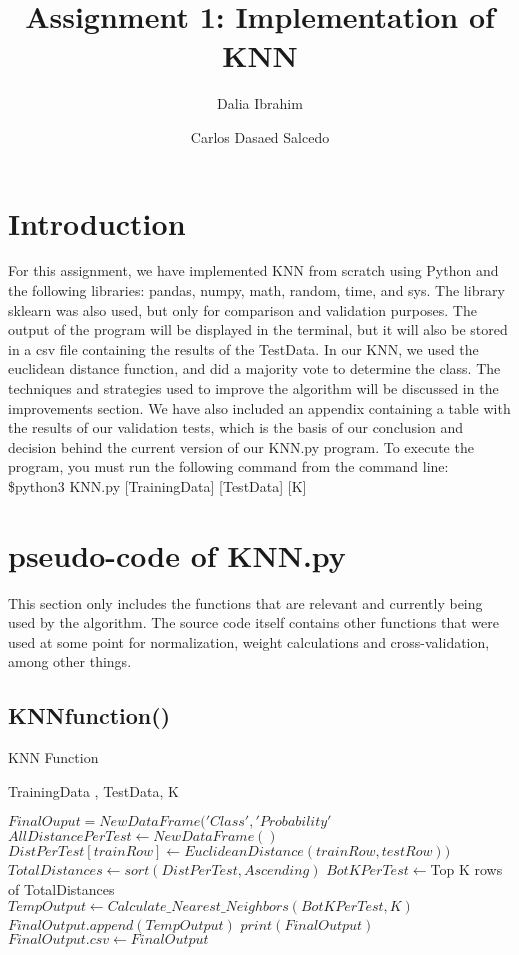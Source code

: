 \documentclass{article}
\author[1]{Dalia Ibrahim}
\author[2]{Carlos Dasaed Salcedo}
\affil[ ]{Studnet ID}
\affil[1]{201893217}
\affil[2]{201892008}
\begin{document}
  

\title{ Assignment 1: Implementation of KNN}


\maketitle
 \section{Introduction}
For this assignment, we have implemented KNN from scratch using Python and the following libraries: pandas, numpy, math, random, time, and sys. The library sklearn was also used, but only for comparison and validation purposes. The output of the program will be displayed in the terminal, but it will also be stored in a csv file containing the results of the TestData. In our KNN, we used the euclidean distance function, and did a majority vote to determine the class. The techniques and strategies used to improve the algorithm will be discussed in the improvements section. We have also included an appendix containing a table with the results of our validation tests, which is the basis of our conclusion and decision behind the current version of our KNN.py program. To execute the program, you must run the following command from the command line: \\
\$python3 KNN.py [TrainingData] [TestData] [K]\\

 \section{pseudo-code of  KNN.py }
This section only includes the functions that are relevant and currently being used by the algorithm. The source code itself contains other functions that were used at some point for normalization, weight calculations and cross-validation, among other things.
 \subsection{KNNfunction()}

\begin{algorithm}[H]
\caption{KNN Function}
\begin{algorithmic}[1]
\REQUIRE TrainingData , TestData, K 
  
\STATE $ FinalOuput = NewDataFrame('Class','Probability'	 $
        \STATE  $AllDistancePerTest \gets NewDataFrame()$ 
        	\STATE $ DistPerTest[trainRow] \gets EuclideanDistance( trainRow, testRow ) ) $
      	\ENDFOR  
      	\STATE $TotalDistances \gets sort( DistPerTest,Ascending)$ 
      	\STATE $BotKPerTest \gets $Top K rows of TotalDistances 
      	\STATE $TempOutput \gets Calculate\_Nearest\_Neighbors(BotKPerTest, K)$
      	\STATE $FinalOutput.append(TempOutput)$ 
      	\STATE $print(FinalOutput)$  
      \ENDFOR
      \STATE $FinalOutput.csv \gets FinalOutput $
\end{algorithmic}
\end{algorithm}
\end{document}
